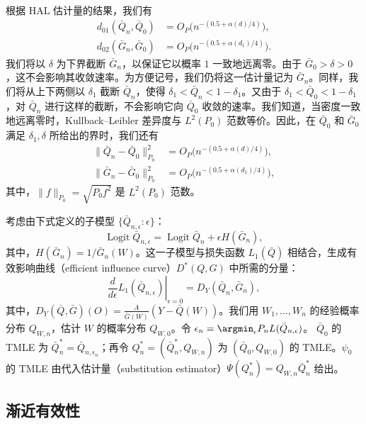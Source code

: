 根据 HAL 估计量的结果，我们有
\[
 \begin{aligned}
 d_{01}(\bar Q_n,\bar Q_0)
   &=O_P\bigl(n^{-(0.5+\alpha(d)/4)}\bigr),\\
 d_{02}(\bar G_n,\bar G_0)
   &=O_P\bigl(n^{-(0.5+\alpha(d_1)/4)}\bigr).
 \end{aligned}
\]
我们将以 $\delta$ 为下界截断 $\bar G_n$，以保证它以概率 $1$ 一致地远离零。由于 $\bar G_0>\delta>0$，这不会影响其收敛速率。为方便记号，我们仍将这一估计量记为 $\bar G_n$。同样，我们将从上下两侧以 $\delta_1$ 截断 $\bar Q_n$，使得 $\delta_1<\bar Q_n<1-\delta_1$。又由于 $\delta_1<\bar Q_0<1-\delta_1$，对 $\bar Q_n$ 进行这样的截断，不会影响它向 $\bar Q_0$ 收敛的速率。我们知道，当密度一致地远离零时，Kullback--Leibler 差异度与 $L^2(P_0)$ 范数等价。因此，在 $\bar Q_0$ 和 $\bar G_0$ 满足 $\delta_1,\delta$ 所给出的界时，我们还有
\[
 \begin{aligned}
 \|\bar Q_n-\bar Q_0\|_{P_0}^2
   &=O_P\bigl(n^{-(0.5+\alpha(d)/4)}\bigr),\\
 \|\bar G_n-\bar G_0\|_{P_0}^2
   &=O_P\bigl(n^{-(0.5+\alpha(d_1)/4)}\bigr),
 \end{aligned}
\]
其中，$\|f\|_{P_0}=\sqrt{P_0f^2}$ 是 $L^2(P_0)$ 范数。

考虑由下式定义的子模型 $\{\bar Q_{n,\epsilon}:\epsilon\}$：
\[
 \operatorname{Logit}\bar Q_{n,\epsilon}
 =\operatorname{Logit}\bar Q_n+\epsilon H(\bar G_n),
\]
其中，$H(\bar G_n)=1/\bar G_n(W)$。这一子模型与损失函数 $L_1(\bar Q)$ 相结合，生成有效影响曲线（efficient influence curve）$D^*(Q,G)$ 中所需的分量：
\[
 \left.\frac{d}{d\epsilon}L_1(\bar Q_{n,\epsilon})
 \right|_{\epsilon=0}=D_Y(\bar Q_n,\bar G_n),
\]
其中，$D_Y(\bar Q,\bar G)(O)=\frac{A}{\bar G(W)}(Y-\bar Q(W))$。我们用 $W_1,\ldots,W_n$ 的经验概率分布 $Q_{W,n}$，估计 $W$ 的概率分布 $Q_{W,0}$。令
$\epsilon_n=\argmin_\epsilon P_nL(\bar Q_{n,\epsilon})$。
$\bar Q_0$ 的 TMLE 为 $\bar Q_n^*=\bar Q_{n,\epsilon_n}$；再令 $Q_n^*=(\bar Q_n^*,Q_{W,n})$ 为 $(\bar Q_0,Q_{W,0})$ 的 TMLE。$\psi_0$ 的 TMLE 由代入估计量（substitution estimator）$\Psi(Q_n^*)=Q_{W,n}\bar Q_n^*$ 给出。

\subsection{渐近有效性}
\label{subsec:ch07-asymptotic-efficiency}


